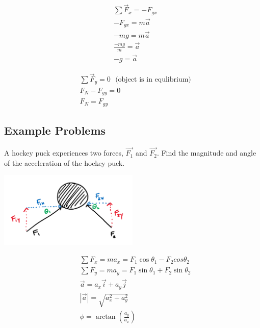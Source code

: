$$
	\begin{aligned}
		&\sum \vec F_x = -F_{gx}\\
		&-F_{gx} = m\vec{a}\\
		&-mg = m\vec{a}\\
		&\frac{-mg}{m} = \vec{a}\\
		&{-g} = \vec{a}
	\end{aligned}
$$

$$
	\begin{aligned}
		&\sum \vec F_y = 0 \:\:\: \text{(object is in equlibrium)}\\
		&F_{N} - F_{gy} = 0\\
		&F_N = F_{gy}
	\end{aligned}
$$

\subsection*{Example Problems}

\begin{problem}
	A hockey puck experiences two forces, $\vec{F_1}$ and $\vec{F_2}$. Find the magnitude and angle of the acceleration of the hockey puck.

	\begin{center}
		\includegraphics[width=0.5\textwidth]{chapters/ch3/images/fig3_5.PNG}
	\end{center}

	$$
		\begin{aligned}
			&\sum F_x = ma_x = F_1\cos\theta_1 - F_2cos\theta_2\\
			&\sum F_y = ma_y = F_1\sin\theta_1 + F_2\sin\theta_2\\
			&\vec a = a_x \vec i + a_y \vec j\\
			&|\vec a| = \sqrt{a_x^2 + a_y^2}\\
			&\phi = \arctan\left(\frac{a_y}{a_x}\right)
		\end{aligned}
	$$
\end{problem}



